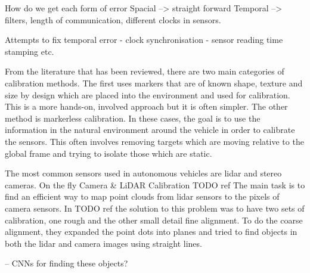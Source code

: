 How do we get each form of error
Spacial --> straight forward
Temporal --> filters, length of communication, different clocks in sensors.


Attempts to fix temporal error
- clock synchronisation
- sensor reading time stamping 
etc. 


From the literature that has been reviewed, there are two main categories of calibration methods. The first uses markers that are of known shape, texture and size by design which are placed into the environment and used for calibration. This is a more hands-on, involved approach but it is often simpler. 
The other method is markerless calibration. In these cases, the goal is to use the information in the natural environment around the vehicle in order to calibrate the sensors. This often involves removing targets which are moving relative to the global frame and trying to isolate those which are static. 

The most common sensors used in autonomous vehicles are lidar and stereo cameras. 
On the fly Camera \& LiDAR Calibration
TODO ref
The main task is to find an efficient way to map point clouds from lidar sensors to the pixels of camera sensors. In 
TODO ref
the solution to this problem was to have two sets of calibration, one rough and the other small detail fine alignment. To do the coarse alignment, they expanded the point dots into planes and tried to find objects in both the lidar and camera images using straight lines.

-- CNNs for finding these objects?



